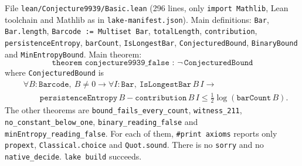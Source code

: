\documentclass[11pt]{article}
\theoremstyle{definition}
\theoremstyle{remark}
\begin{document}
File \texttt{lean/Conjecture9939/Basic.lean} (296 lines, only \texttt{import Mathlib}, Lean
toolchain and Mathlib as in \texttt{lake-manifest.json}). Main definitions: \texttt{Bar},
\texttt{Bar.length}, \texttt{Barcode := Multiset Bar}, \texttt{totalLength}, \texttt{contribution},
\texttt{persistenceEntropy}, \texttt{barCount}, \texttt{IsLongestBar}, \texttt{ConjecturedBound},
\texttt{BinaryBound} and \texttt{MinEntropyBound}. Main theorem:
\[
  \texttt{theorem conjecture9939\_false : }\neg\,\texttt{ConjecturedBound}
\]
where \texttt{ConjecturedBound} is
\[
  \begin{aligned}
  &\forall B:\texttt{Barcode},\ B\ne0\to\forall I:\texttt{Bar},\ \texttt{IsLongestBar}\,B\,I\to\\
  &\qquad\texttt{persistenceEntropy}\,B-\texttt{contribution}\,B\,I\le\tfrac12\log(\texttt{barCount}\,B).
  \end{aligned}
\]
The other theorems are \texttt{bound\_fails\_every\_count}, \texttt{witness\_211},
\texttt{no\_constant\_below\_one}, \texttt{binary\_reading\_false} and
\texttt{minEntropy\_reading\_false}. For each of them, \texttt{\#print axioms} reports only
\texttt{propext}, \texttt{Classical.choice} and \texttt{Quot.sound}. There is no \texttt{sorry} and
no \texttt{native\_decide}. \texttt{lake build} succeeds.
\end{document}
